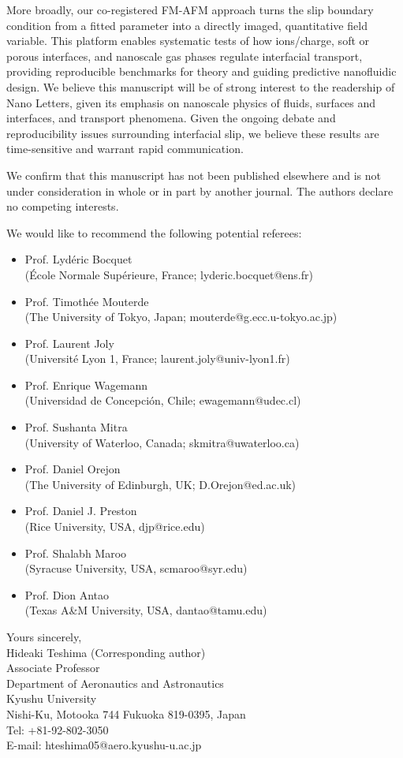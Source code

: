 \documentclass[12pt]{article}
\begin{document}
More broadly, our co-registered FM-AFM approach turns the slip boundary condition from a fitted parameter into a directly imaged, quantitative field variable. This platform enables systematic tests of how ions/charge, soft or porous interfaces, and nanoscale gas phases regulate interfacial transport, providing reproducible benchmarks for theory and guiding predictive nanofluidic design. We believe this manuscript will be of strong interest to the readership of Nano Letters, given its emphasis on nanoscale physics of fluids, surfaces and interfaces, and transport phenomena. Given the ongoing debate and reproducibility issues surrounding interfacial slip, we believe these results are time-sensitive and warrant rapid communication.

We confirm that this manuscript has not been published elsewhere and is not under consideration in whole or in part by another journal. The authors declare no competing interests.

We would like to recommend the following potential referees: 
\begin{itemize}
\item Prof. Lydéric Bocquet\\
(École Normale Supérieure, France; lyderic.bocquet@ens.fr) 
\item Prof. Timothée Mouterde\\
(The University of Tokyo, Japan; mouterde@g.ecc.u-tokyo.ac.jp) 
\item Prof. Laurent Joly\\
(Université Lyon 1, France; laurent.joly@univ-lyon1.fr)
\item Prof. Enrique Wagemann\\
(Universidad de Concepción, Chile; ewagemann@udec.cl)
\item Prof. Sushanta Mitra\\
(University of Waterloo, Canada; skmitra@uwaterloo.ca)
\item Prof. Daniel Orejon\\
(The University of Edinburgh, UK; D.Orejon@ed.ac.uk)
\item Prof. Daniel J. Preston\\
(Rice University, USA, djp@rice.edu)
\item Prof. Shalabh Maroo\\
(Syracuse University, USA, scmaroo@syr.edu)
\item Prof. Dion Antao\\
(Texas A\&M University, USA, dantao@tamu.edu)
\end{itemize}

Yours sincerely,\\
Hideaki Teshima (Corresponding author)\\
Associate Professor\\
Department of Aeronautics and Astronautics\\
Kyushu University\\
Nishi-Ku, Motooka 744 Fukuoka 819-0395, Japan\\
Tel: +81-92-802-3050\\
E-mail: hteshima05@aero.kyushu-u.ac.jp
\end{document}
